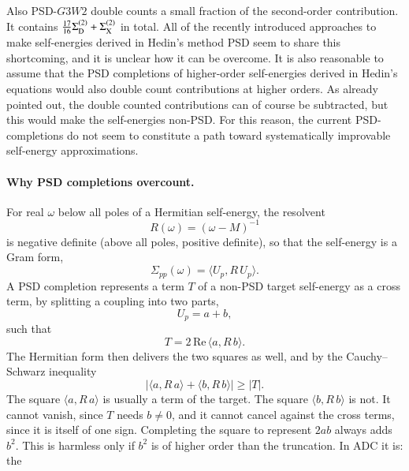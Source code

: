 \documentclass[aip,jcp,reprint,noshowkeys,superscriptaddress]{revtex4-1}
\begin{document}
Also PSD-$G3W2$ double counts a small fraction of the second-order contribution.
It contains $\frac{17}{16}\Sigma^{(2)}_{\rm D}+\Sigma^{(2)}_{\rm X}$ in total.
All of the recently introduced approaches\cite{Bruneval2025,Pavlyukh2026,Marie2026} to 
make self-energies derived in Hedin's method PSD seem to share this shortcoming, 
and it is unclear how it can be overcome. It is also reasonable to assume that the PSD
completions of higher-order self-energies derived in Hedin's equations would 
also double count contributions at higher orders. As already pointed out, 
the double counted contributions can of course be subtracted, but this would make the 
self-energies non-PSD. For this reason, the current PSD-completions do not seem 
to constitute a path toward systematically improvable self-energy approximations.

\paragraph{Why PSD completions overcount.}
For real $\omega$ below all poles of a Hermitian self-energy, the resolvent
\begin{equation}
R(\omega)=(\omega-M)^{-1}
\end{equation}
is negative definite (above all poles, positive definite), so that the
self-energy is a Gram form,
\begin{equation}
\Sigma_{pp}(\omega)=\langle U_p,R\,U_p\rangle .
\end{equation}
A PSD completion represents a term $T$ of a non-PSD target self-energy as a
cross term, by splitting a coupling into two parts,
\begin{equation}
U_p=a+b ,
\end{equation}
such that
\begin{equation}
T=2\,\mathrm{Re}\,\langle a,R\,b\rangle .
\end{equation}
The Hermitian form then delivers the two squares as well, and by the
Cauchy--Schwarz inequality
\begin{equation}
\big|\langle a,R\,a\rangle+\langle b,R\,b\rangle\big|\geq|T| .
\end{equation}
The square $\langle a,R\,a\rangle$ is usually a term of the target. The square
$\langle b,R\,b\rangle$ is not. It cannot vanish, since $T$ needs $b\neq0$,
and it cannot cancel against the cross terms, since it is itself of one sign.
Completing the square to represent $2ab$ always adds $b^2$. This is harmless
only if $b^2$ is of higher order than the truncation. In ADC it is: the
\end{document}
